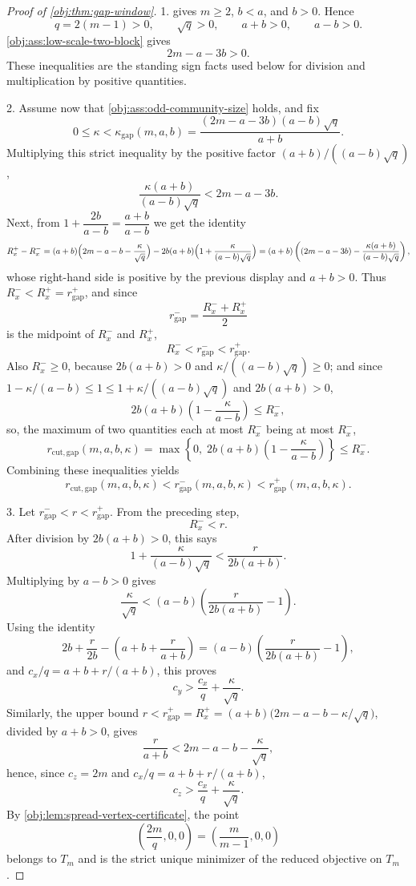 \documentclass[11pt]{article}
\begin{document}
\begin{proof}[Proof of \cref{obj:thm:gap-window}]
1.   gives \(m\ge2\), \(b<a\), and \(b>0\). Hence
\[
q=2(m-1)>0,\qquad \sqrt q>0,\qquad a+b>0,\qquad a-b>0.
\]
\cref{obj:ass:low-scale-two-block} gives
\[
2m-a-3b>0.
\]
These inequalities are the standing sign facts used below for division and multiplication by positive quantities.  %

2.  Assume now that \cref{obj:ass:odd-community-size} holds, and fix
\[
0\le \kappa<\kappa_{\mathrm{gap}}(m,a,b)=\frac{(2m-a-3b)(a-b)\sqrt q}{a+b}.
\]
Multiplying this strict inequality by the positive factor \((a+b)/((a-b)\sqrt q)\),
\[
\frac{\kappa(a+b)}{(a-b)\sqrt q}<2m-a-3b.
\]
Next, from \(1+\dfrac{2b}{a-b}=\dfrac{a+b}{a-b}\) we get the identity
\[
R_x^+-R_x^-
=(a+b)\Bigl(2m-a-b-\frac{\kappa}{\sqrt q}\Bigr)-2b(a+b)\Bigl(1+\frac{\kappa}{(a-b)\sqrt q}\Bigr)
=(a+b)\left((2m-a-3b)-\frac{\kappa(a+b)}{(a-b)\sqrt q}\right),
\]
whose right-hand side is positive by the previous display and \(a+b>0\).  Thus \(R_x^-<R_x^+=r_{\mathrm{gap}}^+\), and since
\[
r_{\mathrm{gap}}^-=\frac{R_x^-+R_x^+}{2}
\]
is the midpoint of \(R_x^-\) and \(R_x^+\),
\[
R_x^-<r_{\mathrm{gap}}^-<r_{\mathrm{gap}}^+.
\]
Also \(R_x^-\ge0\), because \(2b(a+b)>0\) and \(\kappa/((a-b)\sqrt q)\ge0\); and since \(1-\kappa/(a-b)\le1\le1+\kappa/((a-b)\sqrt q)\) and \(2b(a+b)>0\),
\[
2b(a+b)\left(1-\frac{\kappa}{a-b}\right)\le R_x^-,
\]
so, the maximum of two quantities each at most \(R_x^-\) being at most \(R_x^-\),
\[
r_{\mathrm{cut,gap}}(m,a,b,\kappa)
=\max\left\{0,\;2b(a+b)\left(1-\frac{\kappa}{a-b}\right)\right\}
\le R_x^-.
\]
Combining these inequalities yields
\[
r_{\mathrm{cut,gap}}(m,a,b,\kappa)
<
r_{\mathrm{gap}}^-(m,a,b,\kappa)
<
r_{\mathrm{gap}}^+(m,a,b,\kappa).
\]  %

3.  Let \(r_{\mathrm{gap}}^-<r<r_{\mathrm{gap}}^+\). From the preceding step,
\[
R_x^-<r.
\]
After division by \(2b(a+b)>0\), this says
\[
1+\frac{\kappa}{(a-b)\sqrt q}<\frac{r}{2b(a+b)}.
\]
Multiplying by \(a-b>0\) gives
\[
\frac{\kappa}{\sqrt q}
<
(a-b)\left(\frac{r}{2b(a+b)}-1\right).
\]
Using the identity
\[
2b+\frac r{2b}-\left(a+b+\frac r{a+b}\right)
=
(a-b)\left(\frac{r}{2b(a+b)}-1\right),
\]
and \(c_x/q=a+b+r/(a+b)\), this proves
\[
c_y>\frac{c_x}{q}+\frac{\kappa}{\sqrt q}.
\]
Similarly, the upper bound \(r<r_{\mathrm{gap}}^+=R_x^+=(a+b)\bigl(2m-a-b-\kappa/\sqrt q\bigr)\), divided by \(a+b>0\), gives
\[
\frac r{a+b}<2m-a-b-\frac{\kappa}{\sqrt q},
\]
hence, since \(c_z=2m\) and \(c_x/q=a+b+r/(a+b)\),
\[
c_z>\frac{c_x}{q}+\frac{\kappa}{\sqrt q}.
\]
By \cref{obj:lem:spread-vertex-certificate}, the point
\[
\left(\frac{2m}{q},0,0\right)=\left(\frac{m}{m-1},0,0\right)
\]
belongs to \(T_m\) and is the strict unique minimizer of the reduced objective on \(T_m\).  %


\end{proof}
\end{document}
